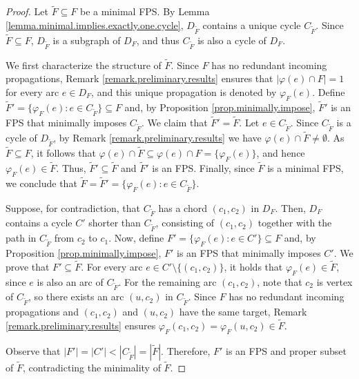\documentclass{article}
\begin{document}
\begin{proof}
Let $\tilde F \subseteq F$ be a minimal FPS.
By Lemma \ref{lemma.minimal.implies.exactly.one.cycle}, $D_{\tilde F}$ contains a unique cycle $C_{\tilde F}$.
Since $\tilde F \subseteq F$, $D_{\tilde F}$ is a subgraph of $D_F$, and thus $C_{\tilde F}$ is also a cycle of $D_F$.

We first characterize the structure of $\tilde F$.
Since $F$ has no redundant incoming propagations, Remark \ref{remark.preliminary.results} ensures that $|\varphi(e) \cap F| = 1$ for every arc $e \in D_F$, and this unique propagation is denoted by $\varphi_F(e)$.
Define $\tilde F' = \{\varphi_F(e) : e \in C_{\tilde F}\} \subseteq F$ and, by Proposition \ref{prop.minimally.impose}, $\tilde F'$ is an FPS that minimally imposes $C_{\tilde F}$. 
We claim that $\tilde F' = \tilde F$.
Let $e \in C_{\tilde F}$. 
Since $C_{\tilde F}$ is a cycle of $D_{\tilde F}$, by Remark \ref{remark.preliminary.results} we have $\varphi(e) \cap \tilde F \neq \emptyset$.
As $\tilde F \subseteq F$, it follows that $\varphi(e) \cap \tilde F \subseteq \varphi(e) \cap F = \{\varphi_F(e)\}$, and hence $\varphi_F(e) \in \tilde F$. Thus, $\tilde F' \subseteq \tilde F$ and $\tilde F'$ is an FPS.
Finally, since $\tilde F$ is a minimal FPS, we conclude that $\tilde F = \tilde F' = \{\varphi_F(e) : e \in C_{\tilde F}\}$.

Suppose, for contradiction, that $C_{\tilde F}$ has a chord $(c_1,c_2)$ in $D_F$.
Then, $D_{F}$ contains a cycle $C'$ shorter than $C_{\tilde F}$, consisting of $(c_1,c_2)$ together with the path in $C_{\tilde F}$ from $c_2$ to $c_1$.
Now, define $F' = \{\varphi_{F}(e): e \in C'\} \subseteq F$ and, by Proposition \ref{prop.minimally.impose}, $F'$ is an FPS that minimally imposes $C'$.
We prove that $F' \subseteq \tilde F$.
For every arc $e \in C' \setminus \{(c_1,c_2)\}$, it holds that $\varphi_F(e) \in \tilde F$, since $e$ is also an arc of $C_{\tilde F}$.
For the remaining arc $(c_1,c_2)$, note that $c_2$ is vertex of $C_{\tilde F}$, so there exists an arc $(u,c_2)$ in $C_{\tilde F}$.
Since $F$ has no redundant incoming propagations and $(c_1,c_2)$ and $(u,c_2)$ have the same target, Remark \ref{remark.preliminary.results} ensures $ \varphi_F(c_1,c_2) = \varphi_F(u,c_2) \in \tilde F$.

Observe that $|F'| = |C'| < |C_{\tilde F}| = |\tilde F|$. Therefore, $F'$ is an FPS and proper subset of $\tilde F$, contradicting the minimality of $\tilde F$.
\end{proof}
\end{document}
